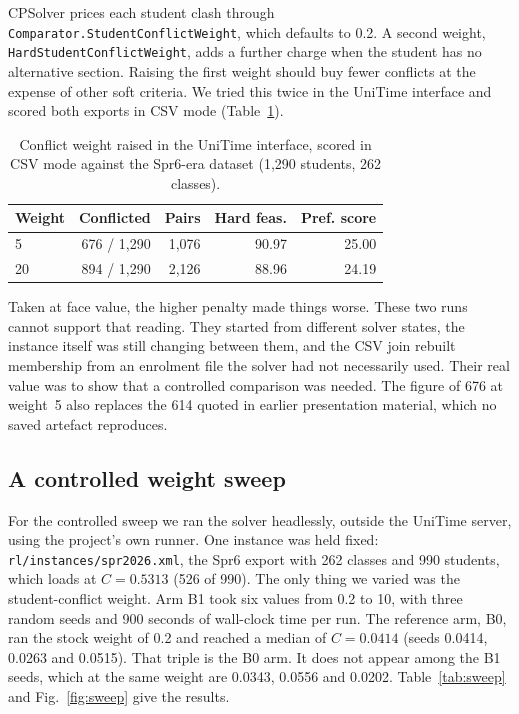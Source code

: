 \documentclass[journal]{IEEEtran}
\begin{document}
CPSolver prices each student clash through \texttt{Comparator.StudentConflictWeight}, which defaults to 0.2. A second weight, \texttt{HardStudentConflictWeight}, adds a further charge when the student has no alternative section. Raising the first weight should buy fewer conflicts at the expense of other soft criteria. We tried this twice in the UniTime interface and scored both exports in CSV mode (Table~\ref{tab:uiweight}).

\begin{table}[t]
\centering
\caption{Conflict weight raised in the UniTime interface, scored in CSV mode against the Spr6-era dataset (1{,}290 students, 262 classes).}
\label{tab:uiweight}
\footnotesize
\begin{tabular}{@{}lrrrr@{}}
\toprule
Weight & Conflicted & Pairs & Hard feas. & Pref. score \\
\midrule
5 & 676 / 1{,}290 & 1{,}076 & 90.97 & 25.00 \\
20 & 894 / 1{,}290 & 2{,}126 & 88.96 & 24.19 \\
\bottomrule
\end{tabular}
\end{table}

Taken at face value, the higher penalty made things worse. These two runs cannot support that reading. They started from different solver states, the instance itself was still changing between them, and the CSV join rebuilt membership from an enrolment file the solver had not necessarily used. Their real value was to show that a controlled comparison was needed. The figure of 676 at weight~5 also replaces the 614 quoted in earlier presentation material, which no saved artefact reproduces.

\subsection{A controlled weight sweep}
\label{sec:weight-sweep}

For the controlled sweep we ran the solver headlessly, outside the UniTime server, using the project's own runner. One instance was held fixed: \texttt{rl/instances/spr2026.xml}, the Spr6 export with 262 classes and 990 students, which loads at $C=0.5313$ (526 of 990). The only thing we varied was the student-conflict weight. Arm B1 took six values from 0.2 to 10, with three random seeds and 900 seconds of wall-clock time per run. The reference arm, B0, ran the stock weight of 0.2 and reached a median of $C=0.0414$ (seeds 0.0414, 0.0263 and 0.0515). That triple is the B0 arm. It does not appear among the B1 seeds, which at the same weight are 0.0343, 0.0556 and 0.0202. Table~\ref{tab:sweep} and Fig.~\ref{fig:sweep} give the results.
\end{document}
